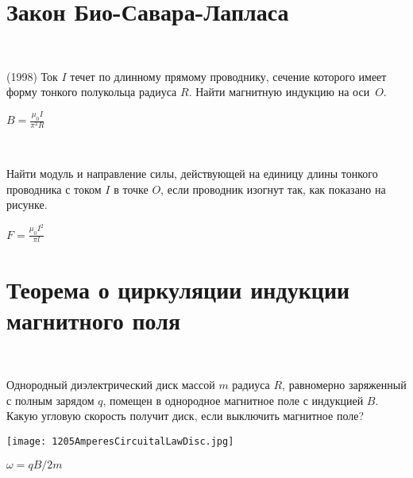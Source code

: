 \section{Закон Био-Савара-Лапласа}

\begin{ex}
\hspace{0pt} \\
\begin{minipage}{.65\textwidth}
(1998) Ток $I$ течет по длинному прямому проводнику, сечение которого имеет форму тонкого полукольца радиуса $R$. Найти магнитную индукцию на оси~$O$.
\end{minipage}
\begin{minipage}{.35\textwidth}
\centering

\end{minipage}
\begin{ans}
$B = \frac{\mu_0 I}{\pi^2 R}$
\end{ans}
\end{ex}

\begin{ex}
\hspace{0pt} \\
\begin{minipage}{.65\textwidth}
Найти модуль и направление силы, действующей на единицу длины тонкого проводника с током $I$ в точке $O$, если проводник изогнут так, как показано на рисунке.
\end{minipage}
\begin{minipage}{.35\textwidth}
\centering

\end{minipage}
\begin{ans}
$F = \frac{\mu_0 I^2}{\pi l}$
\end{ans}
\end{ex}

\section{Теорема о циркуляции индукции магнитного поля}

\begin{ex}
\hspace{0pt} \\
\begin{minipage}{.65\textwidth}
Однородный диэлектрический диск массой $m$ радиуса $R$, равномерно заряженный с полным зарядом $q$, помещен в однородное магнитное поле с индукцией $B$. Какую угловую скорость получит диск, если выключить магнитное поле?
\end{minipage}
\begin{minipage}{.35\textwidth}
\centering
\texttt{[image: 1205AmperesCircuitalLawDisc.jpg]}
\end{minipage}
\begin{ans}
$\omega = qB/2m$
\end{ans}
\end{ex}

